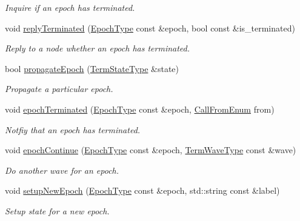 \begin{DoxyCompactItemize}
\begin{DoxyCompactList}\small\item\em Inquire if an epoch has terminated. \end{DoxyCompactList}\item 
void \hyperlink{structvt_1_1term_1_1_termination_detector_a4ea359dfd9c7cbd1c8dc96f5dff78ed1}{reply\+Terminated} (\hyperlink{namespacevt_a985a5adf291c34a3ca263b3378388236}{Epoch\+Type} const \&epoch, bool const \&is\+\_\+terminated)
\begin{DoxyCompactList}\small\item\em Reply to a node whether an epoch has terminated. \end{DoxyCompactList}\item 
bool \hyperlink{structvt_1_1term_1_1_termination_detector_a8f39f31278d42572260d09fb4c72aceb}{propagate\+Epoch} (\hyperlink{structvt_1_1term_1_1_term_action_ae4c635b69751d887666814700ed64d65}{Term\+State\+Type} \&state)
\begin{DoxyCompactList}\small\item\em Propagate a particular epoch. \end{DoxyCompactList}\item 
void \hyperlink{structvt_1_1term_1_1_termination_detector_a54a16b81d1c0717a4a7cd1adff5b146e}{epoch\+Terminated} (\hyperlink{namespacevt_a985a5adf291c34a3ca263b3378388236}{Epoch\+Type} const \&epoch, \hyperlink{structvt_1_1term_1_1_termination_detector_a4f3ede9a87f39d86e85f92b36a6c6a30}{Call\+From\+Enum} from)
\begin{DoxyCompactList}\small\item\em Notfiy that an epoch has terminated. \end{DoxyCompactList}\item 
void \hyperlink{structvt_1_1term_1_1_termination_detector_aa26ade7d870d21b3ec9f5e97154bb847}{epoch\+Continue} (\hyperlink{namespacevt_a985a5adf291c34a3ca263b3378388236}{Epoch\+Type} const \&epoch, \hyperlink{namespacevt_1_1term_a4af17606966b2b5a6cba523bc39095a3}{Term\+Wave\+Type} const \&wave)
\begin{DoxyCompactList}\small\item\em Do another wave for an epoch. \end{DoxyCompactList}\item 
void \hyperlink{structvt_1_1term_1_1_termination_detector_a0522eb82931331906a8be4a3571393b5}{setup\+New\+Epoch} (\hyperlink{namespacevt_a985a5adf291c34a3ca263b3378388236}{Epoch\+Type} const \&epoch, std\+::string const \&label)
\begin{DoxyCompactList}\small\item\em Setup state for a new epoch. \end{DoxyCompactList}\item 

\end{DoxyCompactItemize}
